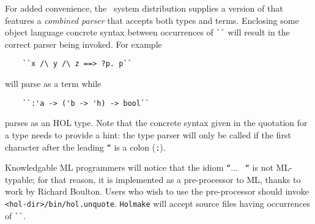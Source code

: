 For added convenience, the \HOL\ system distribution supplies a version
of \holn{} that features a {\it combined parser\/} that accepts both types
and terms. Enclosing some object language concrete syntax between
occurrences of \verb+``+ will result in the correct parser being
invoked. For example

\begin{verbatim}
    ``x /\ y /\ z ==> ?p. p``
\end{verbatim}

\noindent will parse as a term while

\begin{verbatim}
    ``:'a -> ('b -> 'h) -> bool``
\end{verbatim}

\noindent parses as an HOL type. Note that the concrete syntax given in
the quotation for a type needs to provide a hint: the type parser will
only be called if the first character after the leading {\tt ``} is a
colon (\verb+:+).

Knowledgable ML programmers will notice that the idiom {\tt ``}$\ldots$ {\tt
  ``} is not ML-typable; for that reason, it is implemented as a
  pre-processor to ML, thanks to work by Richard Boulton. Users who wish
  to use the pre-processor should invoke {\tt
  <hol-dir>/bin/hol.unquote}. {\small\verb+Holmake+} will accept
  source files having occurrences of \verb+``+.


